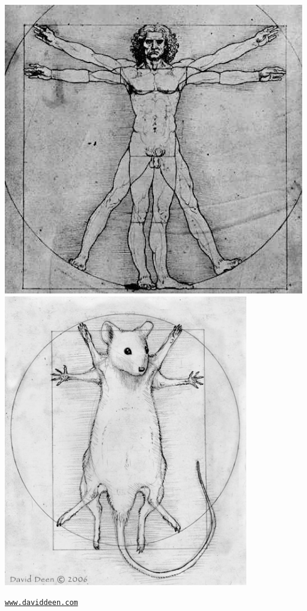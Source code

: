 \documentclass[12pt]{article}
\newcommand{\smallestsize}{\fontsize{18}{22} \selectfont}
\begin{document}
\centerline{
\includegraphics[height=5in]{FigsA/da-vinci-man.jpg}
\includegraphics[height=5in]{FigsA/vitruvian_mouse.jpg}
}

{\color{myblue} \smallestsize \hfill
  \href{http://www.daviddeen.com}{\tt www.daviddeen.com} \hspace*{11mm}}
\end{document}
